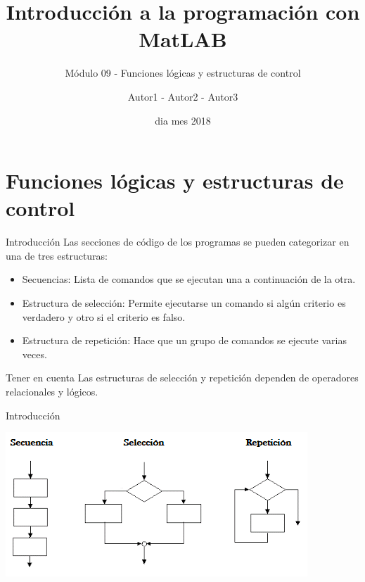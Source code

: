 \documentclass{bredelebeamer}
\title[Programación en MatLAB]{Introducción a la programación con MatLAB}
\subtitle{Módulo 09 - Funciones lógicas y estructuras de control}
\author{Autor1 - Autor2 - Autor3\inst{1}}
\institute[UTN.BA]
{
  \inst{1}%
  Universidad Tecnológica Nacional\\
  Facultad Regional Buenos Aires
  }
\date{dia mes 2018}
\begin{document}
\begin{frame}
  \titlepage 
\end{frame}



\section{Funciones lógicas y estructuras de control}

\begin{frame}{Introducción}
Las secciones de código de los programas se pueden categorizar en una de tres estructuras:\\
\begin{itemize}
\item Secuencias: Lista de comandos que se ejecutan una a continuación de la otra.
\item Estructura de selección: Permite ejecutarse un comando si algún criterio es verdadero y otro si el criterio es falso.
\item Estructura de repetición: Hace que un grupo de comandos se ejecute varias veces.
\end{itemize}
\begin{block}{Tener en cuenta}
Las estructuras de selección y repetición dependen de operadores relacionales y lógicos.
\end{block}
\end{frame}

\begin{frame}{Introducción}
\begin{center}
\includegraphics[scale=0.7]{images/pantalla3.png}
\end{center}
\end{frame}
\end{document}
